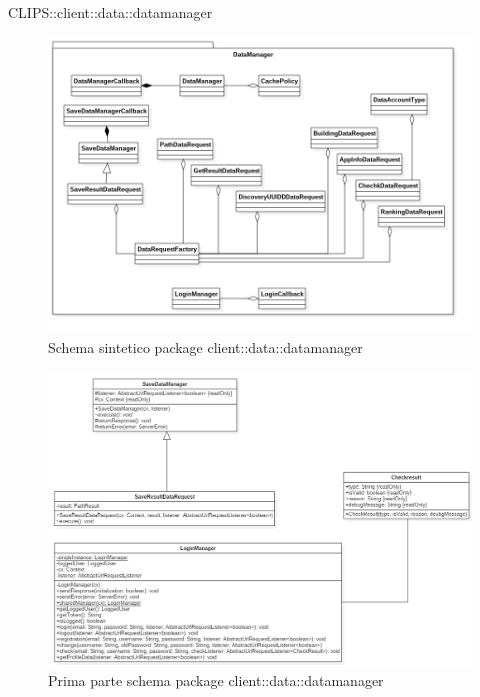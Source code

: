 \begin{componente}{CLIPS::client::data::datamanager}
\begin{figure}[h!]
	\centering
	\includegraphics[scale=0.45]{img/package/png/client--datamanager--min.png}
	\caption{Schema sintetico package client::data::datamanager}
\end{figure}
\begin{figure}[h!]
	\centering
	\includegraphics[scale=0.5]{img/package/png/client--datamanager1.png}
	\caption{Prima parte schema package client::data::datamanager}
\end{figure}
\begin{figure}[h!]
	\centering

\end{figure}
\end{componente}
